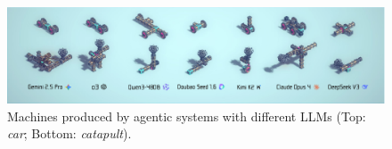 \documentclass{article} %
\theoremstyle{plain}
\theoremstyle{definition}
\begin{document}
\begin{figure}[t!]
  \centering
  \vspace{-2mm}
  \includegraphics[width=\linewidth, clip, trim={0 0.7cm 0 0}]{figures/LLM_Comp_v4_cropped.pdf}
  \captionsetup{font=footnotesize} %
  \vspace{-6mm}
  \caption{\footnotesize Machines produced by agentic systems with different LLMs (Top: \textit{car}; Bottom: \textit{catapult}).}
  \label{fig:test-time-scaling-comp}
  \vspace{-1.5mm}
\end{figure}
\end{document}
